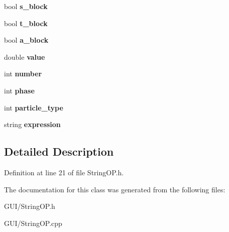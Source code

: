 \begin{DoxyCompactItemize}
bool {\bfseries s\+\_\+block}
\item 
\mbox{\label{class_c_string_o_p_aa31acffbfd1df460fec4505e81e00895}} 
bool {\bfseries t\+\_\+block}
\item 
\mbox{\label{class_c_string_o_p_a5d41f33fd07ee285f2326aa8c194baf2}} 
bool {\bfseries a\+\_\+block}
\item 
\mbox{\label{class_c_string_o_p_a6e2b26e624eddd5aeb71b6ba0cc5d9d2}} 
double {\bfseries value}
\item 
\mbox{\label{class_c_string_o_p_abd22a541fb2b651003d9e1fa2ecf0adf}} 
int {\bfseries number}
\item 
\mbox{\label{class_c_string_o_p_a860428d052d268087c46d4277c0604d0}} 
int {\bfseries phase}
\item 
\mbox{\label{class_c_string_o_p_acfe4fb0c8aab59e8888ce804e4774ddd}} 
int {\bfseries particle\+\_\+type}
\item 
\mbox{\label{class_c_string_o_p_a667e04eaf5c78024f571192f52b8f3f5}} 
string {\bfseries expression}
\end{DoxyCompactItemize}


\subsection{Detailed Description}


Definition at line 21 of file String\+O\+P.\+h.



The documentation for this class was generated from the following files\+:\begin{DoxyCompactItemize}
\item 
G\+U\+I/String\+O\+P.\+h\item 
G\+U\+I/String\+O\+P.\+cpp\end{DoxyCompactItemize}
